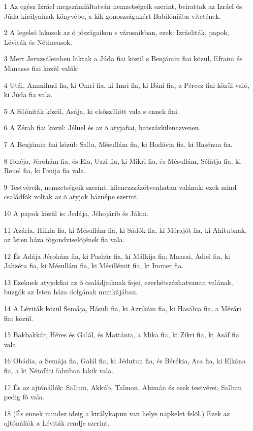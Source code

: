 \par 1 Az egész Izráel megszámláltatván nemzetségeik szerint, beirattak az Izráel és Júda királyainak könyvébe, a kik gonoszságukért Babilóniába vitetének.
\par 2 A legelsõ lakosok az õ jószágaikon s városaikban, ezek: Izráeliták, papok, Léviták és Nétineusok.
\par 3 Mert Jeruzsálemben laktak a Júda fiai közül s Benjámin fiai közül, Efraim és Manasse fiai közül valók:
\par 4 Utái, Ammihud fia, ki Omri fia, ki Imri fia, ki Báni fia, a Pérecz fiai közül való, ki Júda fia vala.
\par 5 A Silóniták közül, Asája, ki elsõszülött vala s ennek fiai.
\par 6 A Zérah fiai közül: Jéluel és az õ atyjafiai, hatszázkilenczvenen.
\par 7 A Benjámin fiai közül: Sallu, Mésullám fia, ki Hodávia fia, ki Hasénua fia.
\par 8 Ibnéja, Jérohám fia, és Ela, Uzzi fia, ki Mikri fia, és Mésullám, Séfátja fia, ki Reuel fia, ki Ibnija fia vala.
\par 9 Testvéreik, nemzetségeik szerint, kilenczszázötvenhatan valának; ezek mind családfõk voltak az õ atyjok háznépe szerint.
\par 10 A papok közül is: Jedája, Jéhojárib és Jákin.
\par 11 Azária, Hilkia fia, ki Mésullám fia, ki Sádók fia, ki Mérajót fia, ki Ahitubnak, az Isten háza fõgondviselõjének fia vala.
\par 12 És Adája Jérohám fia, ki Pashúr fia, ki Málkija fia; Maasai, Adiel fia, ki Jahzéra fia, ki Mésullám fia, ki Mésillémit fia, ki Immer fia.
\par 13 Ezeknek atyjokfiai az õ családjaiknak fejei, ezerhétszázhatvanan valának, buzgók az Isten háza dolgának munkájában.
\par 14 A Léviták közül Semája, Hásub fia, ki Azrikám fia, ki Hasábia fia, a Mérári fiai közül.
\par 15 Bakbakkár, Héres és Galál, és Mattánia, a Mika fia, ki Zikri fia, ki Asáf fia vala.
\par 16 Obádia, a Semája fia, Galál fia, ki Jédutun fia, és Bérékia, Asa fia, ki Elkána fia, a ki Nétofáti faluiban lakik vala.
\par 17 És az ajtónállók: Sallum, Akkúb, Talmon, Ahimán és ezek testvérei; Sallum pedig fõ vala.
\par 18 (És ennek mindez ideig a királykapun van helye napkelet felõl.) Ezek az ajtónállók a Léviták rendje szerint.
